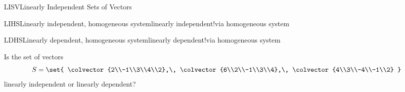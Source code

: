 \begin{subsect}{LISV}{Linearly Independent Sets of Vectors}
\begin{example}{LIHS}{Linearly independent, homogeneous system}{linearly independent!via homogeneous system}
\begin{para}
\end{para}
%
\end{example}
%
%
\begin{example}{LDHS}{Linearly dependent, homogeneous system}{linearly dependent!via homogeneous system}
\begin{para}Is the set of vectors
%
\begin{equation*}
S=\set{
\colvector{2\\-1\\3\\4\\2},\,
\colvector{6\\2\\-1\\3\\4},\,
\colvector{4\\3\\-4\\-1\\2}
}
\end{equation*}
%
linearly independent or linearly dependent?\end{para}


\end{example}
\end{subsect}
